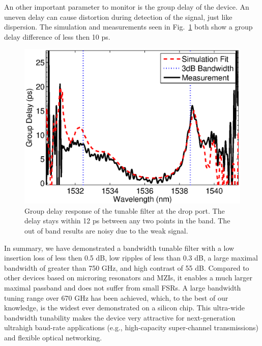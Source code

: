 \documentclass[osajnl,twocolumn,showpacs,superscriptaddress,10pt]{revtex4-1}
\begin{document}
An other important parameter to monitor is the group delay of the device. An uneven delay can cause distortion during detection of the signal, just like dispersion. The simulation and measurements seen in Fig.~\ref{fig:phase} both show a group delay difference of less then 10 ps.
\begin{figure}[tbp]
\centering
\includegraphics[width=.99\columnwidth]{data/Phase}
\caption{ Group delay response of the tunable filter at the drop port. The delay stays within 12 ps between any two points in the band. The out of band results are noisy due to the weak signal.}
\label{fig:phase}
\end{figure}


In summary, we have demonstrated a bandwidth tunable filter with a low insertion loss of less then 0.5 dB, low ripples of less than 0.3 dB, a large maximal bandwidth of greater than 750 GHz, and high contrast of 55 dB. 
Compared to other devices based on microring resonators and MZIs, it enables a much larger maximal passband and does not suffer from small FSRs. 
A large bandwidth tuning range over 670 GHz has been achieved, which, to the best of our knowledge, is the widest ever demonstrated on a silicon chip. 
This ultra-wide bandwidth tunability makes the device very attractive for next-generation ultrahigh baud-rate applications (e.g., high-capacity super-channel transmissions) and flexible optical networking. 
\end{document}
